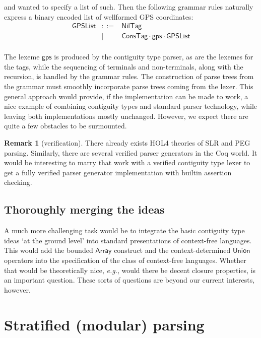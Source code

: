 \documentclass{article}
\newcommand{\eg}{\textit{e.g.}}
\newcommand{\konst}[1]{\ensuremath{\mathsf{#1}}}
\theoremstyle{definition}
\newtheorem*{remark}{Remark}
\begin{document}
and wanted to specify a list of such. Then the following grammar rules
naturally express a binary encoded list of wellformed GPS
coordinates:
\[
\begin{array}{rcl}
 \konst{GPSList} & ::=  & \konst{NilTag} \\
                 & \mid & \konst{ConsTag} \cdot \konst{gps} \cdot \konst{GPSList} \\
\end{array}
\]

The lexeme \konst{gps} is produced by the contiguity type parser, as
are the lexemes for the tags, while the sequencing of terminals and
non-terminals, along with the recursion, is handled by the grammar
rules. The construction of parse trees from the grammar must smoothly
incorporate parse trees coming from the lexer. This general approach
would provide, if the implementation can be made to work, a nice
example of combining contiguity types and standard parser technology,
while leaving both implementations mostly unchanged. However, we
expect there are quite a few obstacles to be surmounted.

\begin{remark} [verification] There already exists
  HOL4 theories of SLR and PEG parsing. Similarly, there are several
  verified parser generators in the Coq world. It would be interesting
  to marry that work with a verified contiguity type lexer to get a
  fully verified parser generator implementation with builtin
  assertion checking.
\end{remark}

\subsection{Thoroughly merging the ideas}

A much more challenging task would be to integrate the basic
contiguity type ideas `at the ground level' into standard
presentations of context-free languages. This would add the bounded
\konst{Array} construct and the context-determined \konst{Union}
operators into the specification of the class of context-free
languages. Whether that would be theoretically nice, \eg, would there
be decent closure properties, is an important question. These sorts of
questions are beyond our current interests, however.

\section{Stratified (modular) parsing}
\end{document}
